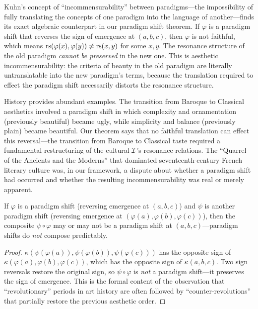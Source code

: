 \begin{remark}
\label{rem:paradigm-incommensurability}
Kuhn's concept of ``incommensurability'' between paradigms---the impossibility of fully translating the concepts of one paradigm into the language of another---finds its exact algebraic counterpart in our paradigm shift theorem.  If $\varphi$ is a paradigm shift that reverses the sign of emergence at $(a, b, c)$, then $\varphi$ is not faithful, which means $\mathrm{rs}(\varphi(x), \varphi(y)) \neq \mathrm{rs}(x, y)$ for some $x, y$.  The resonance structure of the old paradigm \emph{cannot be preserved} in the new one.  This is aesthetic incommensurability: the criteria of beauty in the old paradigm are literally untranslatable into the new paradigm's terms, because the translation required to effect the paradigm shift necessarily distorts the resonance structure.

History provides abundant examples.  The transition from Baroque to Classical aesthetics involved a paradigm shift in which complexity and ornamentation (previously beautiful) became ugly, while simplicity and balance (previously plain) became beautiful.  Our theorem says that no faithful translation can effect this reversal---the transition from Baroque to Classical taste required a fundamental restructuring of the cultural $\mathcal{I}$'s resonance relations.  The ``Quarrel of the Ancients and the Moderns'' that dominated seventeenth-century French literary culture was, in our framework, a dispute about whether a paradigm shift had occurred and whether the resulting incommensurability was real or merely apparent.
\end{remark}

\begin{theorem}
\label{thm:paradigm-shift-compose}
If $\varphi$ is a paradigm shift (reversing emergence at $(a, b, c)$) and $\psi$ is another paradigm shift (reversing emergence at $(\varphi(a), \varphi(b), \varphi(c))$), then the composite $\psi \circ \varphi$ may or may not be a paradigm shift at $(a, b, c)$---paradigm shifts do \emph{not} compose predictably.
\end{theorem}

\begin{proof}
$\kappa(\psi(\varphi(a)), \psi(\varphi(b)), \psi(\varphi(c)))$ has the opposite sign of $\kappa(\varphi(a), \varphi(b), \varphi(c))$, which has the opposite sign of $\kappa(a, b, c)$.  Two sign reversals restore the original sign, so $\psi \circ \varphi$ is \emph{not} a paradigm shift---it preserves the sign of emergence.  This is the formal content of the observation that ``revolutionary'' periods in art history are often followed by ``counter-revolutions'' that partially restore the previous aesthetic order.
\end{proof}

